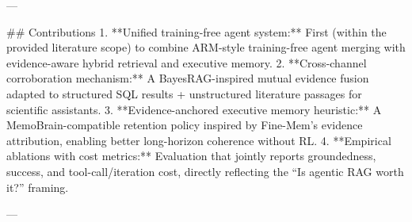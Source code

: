 ---

## Contributions  
1. **Unified training-free agent system:** First (within the provided literature scope) to combine ARM-style training-free agent merging with evidence-aware hybrid retrieval and executive memory.  
2. **Cross-channel corroboration mechanism:** A BayesRAG-inspired mutual evidence fusion adapted to structured SQL results + unstructured literature passages for scientific assistants.  
3. **Evidence-anchored executive memory heuristic:** A MemoBrain-compatible retention policy inspired by Fine-Mem’s evidence attribution, enabling better long-horizon coherence without RL.  
4. **Empirical ablations with cost metrics:** Evaluation that jointly reports groundedness, success, and tool-call/iteration cost, directly reflecting the “Is agentic RAG worth it?” framing.

---
